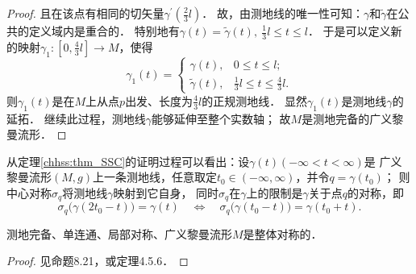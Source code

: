 \begin{proof}
    且在该点有相同的切矢量$\gamma^{\prime}(\frac{2}{3} l)$．
    故，由测地线的唯一性可知：$\gamma$和$\tilde{\gamma}$在公共的定义域内是重合的．
    特别地有$\gamma(t)=\tilde{\gamma}(t), \ \frac{1}{3} l \leqslant t \leqslant l $．
    于是可以定义新的映射$\gamma_1:\left[0, \frac{4}{3} l\right] \rightarrow M$，使得
    \begin{equation}\label{chhss:eqn_tmp-gd20}
        \gamma_1(t)=   \begin{cases} 
            \gamma(t), & 0 \leqslant t \leqslant l ; \\ 
            \tilde{\gamma}(t), & \frac{1}{3} l \leqslant t \leqslant \frac{4}{3} l .
        \end{cases}
    \end{equation}
    则$\gamma_1(t)$是在$M$上从点$p$出发、长度为$\frac{4}{3} l$的正规测地线．
    显然$\gamma_1(t)$是测地线$\gamma$的延拓．
    继续此过程，测地线$\gamma$能够延伸至整个实数轴；
    故$M$是测地完备的广义黎曼流形．
\end{proof}

从定理\ref{chhss:thm_SSC}的证明过程可以看出：设$\gamma(t)(-\infty < t< \infty)$是
广义黎曼流形$(M,g)$上一条测地线，任意取定$t_0\in (-\infty , \infty)$，并令$q=\gamma(t_0)$；
则中心对称$\sigma_q$将测地线$\gamma$映射到它自身，
同时$\sigma_q$在$\gamma$上的限制是$\gamma$关于点$q$的对称，即
\begin{equation}\label{chhss:eqn_geo-sym}
    \sigma_q\bigl(\gamma(2t_0- t)\bigr) = \gamma(t) \quad \Leftrightarrow \quad
    \sigma_q\bigl(\gamma(t_0- t)\bigr) = \gamma(t_0+t) .
\end{equation}

\begin{proposition}\label{chhss:thm_l2g}
    测地完备、单连通、局部对称、广义黎曼流形$M$是整体对称的．
\end{proposition}
\begin{proof}
    见\parencite{oneill1983}命题8.21，或\parencite{helgason-2001}定理4.5.6．
\end{proof}


